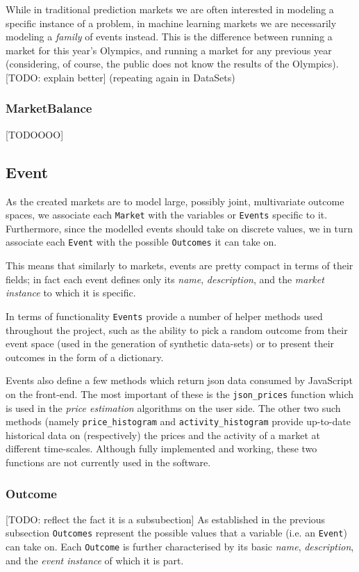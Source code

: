 \documentclass[bsc,frontabs,twoside,singlespacing,parskip,deptreport]{infthesis}     %
\begin{document}
       
    While in traditional prediction markets we are often interested in modeling a specific instance of a problem, in machine learning markets we are necessarily modeling a {\em family} of events instead. This is the difference between running a market for this year’s Olympics, and running a market for any previous year (considering, of course, the public does not know the results of the Olympics). [TODO: explain better] (repeating again in DataSets)

\subsubsection{MarketBalance}

	[TODOOOO]
    
\subsection{Event}

	As the created markets are to model large, possibly joint, multivariate outcome spaces, we associate each {\tt Market} with the variables or {\tt Events} specific to it. Furthermore, since the modelled events should take on discrete values, we in turn associate each {\tt Event} with the possible {\tt Outcomes} it can take on. 

	This means that similarly to markets, events are pretty compact in terms of their fields; in fact each event defines only its {\em name}, {\em description}, and the {\em market instance} to which it is specific.

	In terms of functionality {\tt Events} provide a number of helper methods used throughout the project, such as the ability to pick a random outcome from their event space (used in the generation of synthetic data-sets) or to present their outcomes in the form of a dictionary. 
	
	Events also define a few methods which return json data consumed by JavaScript on the front-end. The most important of these is the {\tt json\_prices} function which is used in the {\it price estimation} algorithms on the user side. The other two such methods (namely {\tt price\_histogram} and {\tt activity\_histogram} provide up-to-date historical data on (respectively) the prices and the activity of a market at different time-scales. Although fully implemented and working, these two functions are not currently used in the software. 

\subsubsection{Outcome}
	[TODO: reflect the fact it is a subsubection]
	As established in the previous subsection {\tt Outcomes} represent the possible values that a variable (i.e. an {\tt Event}) can take on. Each {\tt Outcome} is further characterised by its basic {\it name}, {\it description}, and the {\it event instance} of which it is part. 
\end{document}
